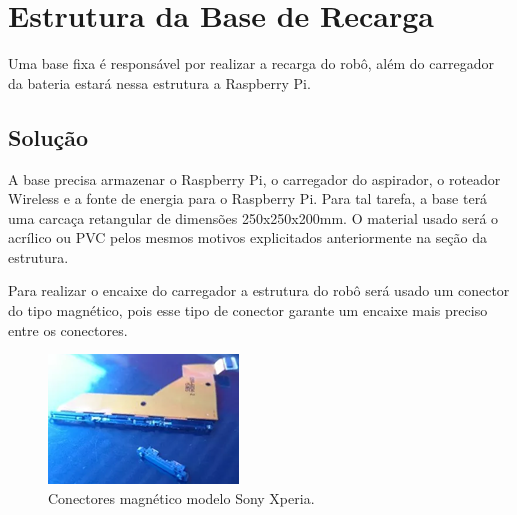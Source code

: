 \section{Estrutura da Base de Recarga} %
\label{sec:estrutura_da_base}
	
	Uma base fixa é responsável por realizar a recarga do robô, além do carregador da bateria estará nessa estrutura a Raspberry Pi.

	\subsection{Solução} %
	\label{sub:solução}
		
		A base precisa armazenar o Raspberry Pi, o carregador do aspirador, o roteador Wireless e a fonte de energia para o Raspberry Pi. Para tal tarefa, a base terá uma carcaça retangular de dimensões 250x250x200mm. O material usado será o acrílico ou PVC pelos mesmos motivos explicitados anteriormente na seção da estrutura. 

		Para realizar o encaixe do carregador a estrutura do robô será usado um conector do tipo magnético, pois esse tipo de conector garante um encaixe mais preciso entre os conectores.

		\begin{figure}[H]
			\centering
			\includegraphics[scale=0.8]{figuras/conector_mag.png}
			\caption{Conectores magnético modelo Sony Xperia.}
			\label{img:conectores}
		\end{figure}

